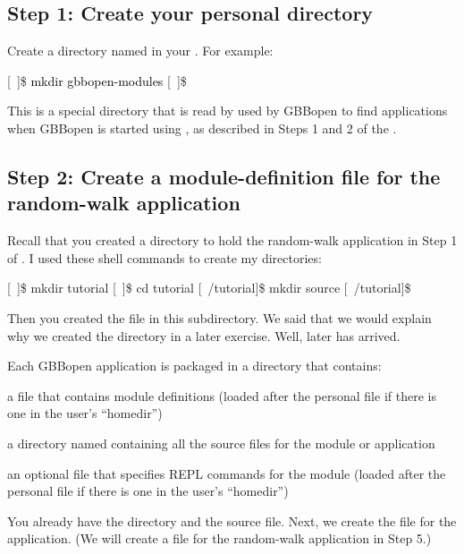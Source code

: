 \documentclass[10pt,twoside,english,pdftex]{article}
\begin{document}
\subsection*{Step 1: Create your personal  directory}

Create a directory named  in your .  For example:
%
\W\supp
\begin{example}
\textcolor{darkergray}{%
  [~]\$ \textcolor{black}{mkdir gbbopen-modules}
  [~]\$}
\end{example}
%
This is a special directory that is read by used by GBBopen to find
applications when GBBopen is started using
, as described in Steps 1 and 2
of the .

\subsection*{Step 2: Create a module-definition file for the random-walk application}

Recall that you created a directory to hold the random-walk application in
Step 1 of .  I used these
shell commands to create my directories:
%
\W\supp
\begin{example}
\textcolor{darkergray}{%
  [~]\$ mkdir tutorial
  [~]\$ cd tutorial
  [~/tutorial]\$ mkdir source
  [~/tutorial]\$}
\end{example}
%
Then you created the  file in this 
subdirectory. We said that we would explain why we created the 
directory in a later exercise.  Well, later has arrived.

Each GBBopen application is packaged in a directory that contains:
\begin{tightitemize}
\item a  file that contains module definitions (loaded
  after the personal  file if
  there is one in the user's ``homedir'')
\item a directory named  containing all the source files for the
  module or application
\item an optional  file that specifies REPL commands
  for the module (loaded after the personal  file
  if there is one in the user's ``homedir'')
\end{tightitemize}
%
You already have the  directory and the
 source file.  Next, we create the
 file for the application.  (We will create a
 file for the random-walk application in Step 5.)
\end{document}
